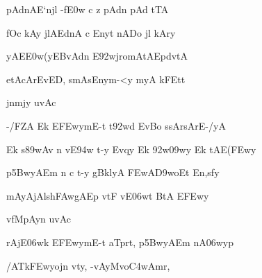 \ujvers\dnnemsloka 
{\dn pAd\?nAE`njl\2 -f\?\3E0w c z\2 pAd\?n pAd\2 tTA}
\dontdisplaylinenum

\dnnemslokab 
{\dn fOc\2 kAy\0 jlAEdnA c Enyt\2 nADo jl\2 kAry\? \dandadn\dontdisplaylinenum}

\dnnemslokac 
{\dn {}yA\0E\3E0w(yEBvAdn\2 E\392wjromA\0tAEpd\?vtA}
\dontdisplaylinenum

\dnnemslokad 
{\dn etAcArEvED, smAsEnym-<y\2 myA kFEt\0t \vegdn\dontdisplaylinenum}




\dnvers

{\dn jnm\?jy uvAc{\dandabdn}\dontdisplaylinenum }

\nemsloka

\dnnemsloka 
{\dn -/FZA\2 Ek\2 E\3FEwymE-t t\392wd EvBo s\2sArsArE-/yA}
\dontdisplaylinenum

\dnnemslokab 
{\dn Ek\2 s\389wAv n v\?E\394w t-y Evqy\? Ek\2 \392w\?\309wy Ek\2 tAE(\3FEwy \dandadn\dontdisplaylinenum}

\dnnemslokac 
{\dn p\35BwyAEm n c t-y gB\0klyA \3FEwA\3D9woEt En,s\2fy}
\dontdisplaylinenum

\dnnemslokad 
{\dn mAyAjAlsh\3FAwgAEp vtF v\0E\306wt BtA\0 E\3FEwy \vegdn\dontdisplaylinenum}


\dnvers

{\dn v\4fMpAyn uvAc{\dandabdn}\dontdisplaylinenum }

\nemsloka

\dnnemsloka 
{\dn rAjE\306wk\2 E\3FEwymE-t aT\0prt, p\35BwyAEm nA\306wyp\?}
\dontdisplaylinenum

\dnnemslokab 
{\dn {}/AT\4{\qvb}k\3FEwyojn\2 vty, -vAyMvo\3C4wAmr\4, \dandadn\dontdisplaylinenum}

